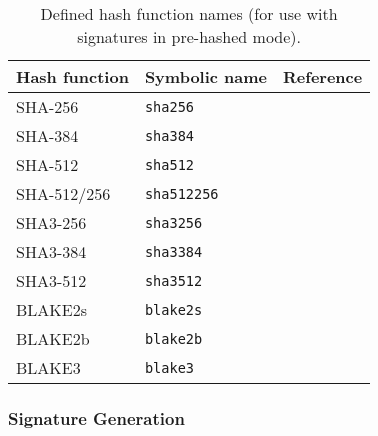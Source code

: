 \documentclass{llncs}
\begin{document}
\begin{table}
    \begin{center}
\begin{tabular}{|l|l|c|}
\hline
\textsf{\textbf{Hash function}} &
\textsf{\textbf{Symbolic name}} &
\textsf{\textbf{Reference}} \\
\hline
    SHA-256     & \verb+sha256+    & \cite{Fips180} \\
    SHA-384     & \verb+sha384+    & \cite{Fips180} \\
    SHA-512     & \verb+sha512+    & \cite{Fips180} \\
    SHA-512/256 & \verb+sha512256+ & \cite{Fips180} \\
    SHA3-256    & \verb+sha3256+   & \cite{Fips202} \\
    SHA3-384    & \verb+sha3384+   & \cite{Fips202} \\
    SHA3-512    & \verb+sha3512+   & \cite{Fips202} \\
    BLAKE2s     & \verb+blake2s+   & \cite{BLAKE2} \\
    BLAKE2b     & \verb+blake2b+   & \cite{BLAKE2} \\
    BLAKE3      & \verb+blake3+    & \cite{BLAKE3} \\
\hline
\end{tabular}
    \end{center}
    \caption{\label{tab:hashnames}Defined hash function names (for
    use with signatures in pre-hashed mode).}
\end{table}

\subsubsection{Signature Generation}
\end{document}
